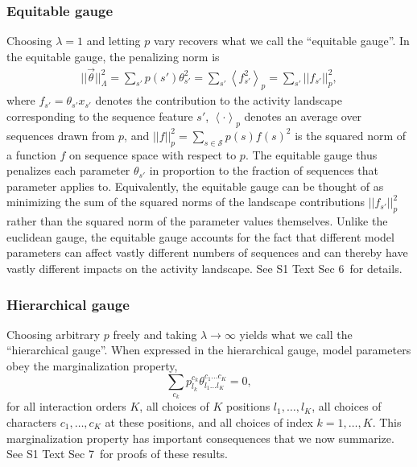 \documentclass[10pt,letterpaper]{article}
\newcommand{\braket}[1]{\left\langle #1 \right\rangle}
\newcommand{\si}[1]{{S1 Text Sec #1}}
\begin{document}
\subsubsection*{Equitable gauge}
Choosing $\lambda = 1$ and letting $p$ vary recovers what we call the ``equitable gauge''. In the equitable gauge, the penalizing norm is
\begin{eqnarray}
    ||\vec{\theta}||^2_\Lambda  = \sum_{s'} p(s') \theta^2_{s'} \label{eq:equitable1} = \sum_{s'} \braket{f_{s'}^2}_p \label{eq:equitable2} = \sum_{s'} ||f_{s'}||^2_p,
\end{eqnarray}
where $f_{s'} = \theta_{s'} x_{s'}$ denotes the contribution to the activity landscape corresponding to the sequence feature $s'$, $\braket{\cdot}_p$ denotes an average over sequences drawn from $p$, and $||f||_p^2=\sum_{s \in \mathcal{S}} p(s) f(s)^2$ is the squared norm of a function $f$ on sequence space with respect to $p$. The equitable gauge thus penalizes each parameter $\theta_{s'}$ in proportion to the fraction of sequences that parameter applies to. Equivalently, the equitable gauge can be thought of as minimizing the sum of the squared norms of the landscape contributions $||f_{s'}||_p^2$ rather than the squared norm of the parameter values themselves. Unlike the euclidean gauge, the equitable gauge accounts for the fact that different model parameters can affect vastly different numbers of sequences and can thereby have vastly different impacts on the activity landscape. See \si{6}\ for details.


\subsubsection*{Hierarchical gauge}

Choosing arbitrary $p$ freely and taking $\lambda \rightarrow \infty$ yields what we call the ``hierarchical gauge''. When expressed in the hierarchical gauge, model parameters obey the marginalization property,
\begin{equation}
    \sum_{c_k} p_{l_k}^{c_k} \theta_{l_1 \ldots l_K}^{c_1 \ldots c_K} = 0, \label{eq:marginalization}
\end{equation}
for all interaction orders $K$, all choices of $K$ positions $l_1, \ldots, l_K$, all choices of characters $c_1,\ldots,c_K$ at these positions, and all choices of index $k=1,\ldots,K$. This marginalization property has important consequences that we now summarize. See \si{7}\ for proofs of these results.
\end{document}
